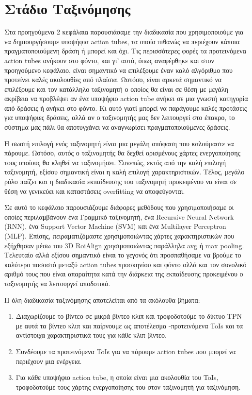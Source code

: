 \chapter{\gr Στάδιο Ταξινόμησης\gr }
Στα προηγούμενα 2 κεφάλαια παρουσιάσαμε την διαδικασία που χρησιμοποιούμε για να δημιουργήσουμε
υποψήφια \en action tubes\gr,  τα οποία πιθανώς να περιέχουν κάποια πραγματοποιούμενη δράση ή μπορεί και όχι.
Τις περισσότερες φορές τα προτεινόμενα \en action tubes \gr ανήκουν στο φόντο, και γι' αυτό, όπως αναφέρθηκε
και στον προηγούμενο κεφάλαιο, είναι σημαντικό να επιλέξουμε έναν καλό αλγόριθμο που προτείνει καλές ακολουθίες
από πλαίσια. Ωστόσο, είναι αρκετά σημαντικό να επιλέξουμε και τον κατάλληλο ταξινομητή ο οποίος θα είναι σε θέση
με μεγάλη ακρίβεια να προβλέψει αν ένα υποψήφιο \en action tube \gr ανήκει σε μια γνωστή κατηγορία από δράσεις ή
ανήκει στο φόντο. Κι αυτό γιατί μπορεί να παράγουμε καλές προτάσεις για υποψήφιες δράσεις, αλλά αν ο ταξινομητής μας
δεν λειτουργεί στο έπακρο, το σύστημα μας πάλι θα αποτυγχάνει να αναγνωρίσει πραγματοποιούμενες δράσεις. \par
Η σωστή επιλογή ενός ταξινομητή είναι μια μεγάλη απόφαση που καλούμαστε να πάρουμε. Ωστόσο,  αυτός ο ταξινομητής θα δεχθεί
ορισμένους χάρτες ενεργοποίησης τους οποίους θα κληθεί να ταξινομήσει. Συνεπώς, εκτός από την καλή επιλογή ταξινομητή, εξίσου
σημαντική είναι η καλή επιλογή χαρακτηριστικών. Τέλος, μεγάλο ρόλο παίζει και η διαδικασία εκπαίδευσης του ταξινομητή προκειμένου
να είναι σε θέση να γενικεύει και καταστάσεις \en overfitting \gr να αποφεύγονται. \par
Σε αυτό το κεφάλαιο παρουσιάζουμε διάφορες μεθόδους που χρησιμοποιήσαμε οι οποίες περιλαμβάνουν ένα Γραμμικό ταξινομητή, ένα \en
Recursive Neural Network (RNN)\gr, ένα \en Support Vector Machine (SVM) \gr και ένα \en Multilayer Perceptron (MLP)\gr. Επίσης,
πειραματιζόμαστε χρησιμοποιώντας χάρτες χαρακτηριστικών που εξήχθησαν μέσω του \en 3D RoiAlign \gr χρησιμοποιώντας παράλληλα
\en avg  \gr ή  \en max  pooling\gr. Τελευταίο αλλά εξίσου σημαντικό είναι το γεγονός ότι προσπαθήσαμε να βρούμε το καλύτερο
ποσοστό μεταξύ \en action tubes \gr προσκηνίου και φόντο αλλά και τον συνολικό αριθμό τους που είναι απαραίτητα  κατά την διάρκεια της εκπαίδευσης προκειμένου ο ταξινομητής να λειτουργεί αποδοτικά. \par
Η όλη διαδικασία ταξινόμησης αποτελείται από τα ακόλουθα βήματα:
\begin{enumerate}
\item Διαχωρίζουμε το βίντεο σε μικρά βίντεο κλιπ και τροφοδοτούμε το δίκτυο \en  TPN \gr με αυτά τα βίντεο κλιπ
  και παίρνουμε ως αποτέλεσμα -προτεινόμενα \en ToIs \gr και τα αντίστοιχα χαρακτηριστικά τους για
  κάθε κλιπ βίντεο.
\item Συνδέουμε τα προτεινόμενα \en ToIs \gr για να πάρουμε \en action tubes \gr που μπορεί να περιέχουν
  μια ενέργεια.
\item Για κάθε υποψήφιο \en action tube\gr, η οποία είναι μια ακολουθία του \en ToIs\gr ,
  τροφοδοτούμε τους χάρτης ενεργοποίησης του στον ταξινομητή για ταξινόμηση.
\end{enumerate}

